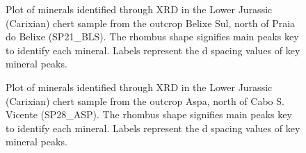 \documentclass[
  a4paper,
  DIV=11,
  numbers=noendperiod]{scrreprt}
\begin{document}
\begin{figure}


\caption{\label{fig-xrd-sp21}Plot of minerals identified through XRD in
the Lower Jurassic (Carixian) chert sample from the outcrop Belixe Sul,
north of Praia do Belixe (SP21\_BLS). The rhombus shape signifies main
peaks key to identify each mineral. Labels represent the d spacing
values of key mineral peaks.}

\end{figure}%

\begin{figure}


\caption{\label{fig-xrd-sp28}Plot of minerals identified through XRD in
the Lower Jurassic (Carixian) chert sample from the outcrop Aspa, north
of Cabo S. Vicente (SP28\_ASP). The rhombus shape signifies main peaks
key to identify each mineral. Labels represent the d spacing values of
key mineral peaks.}

\end{figure}%
\end{document}
